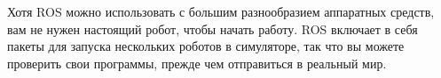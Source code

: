 

Хотя ROS можно использовать с большим разнообразием аппаратных средств, вам не нужен настоящий робот, чтобы начать работу. ROS включает в себя пакеты для запуска нескольких роботов в симуляторе, так что вы можете проверить свои программы, прежде чем отправиться в реальный мир.

